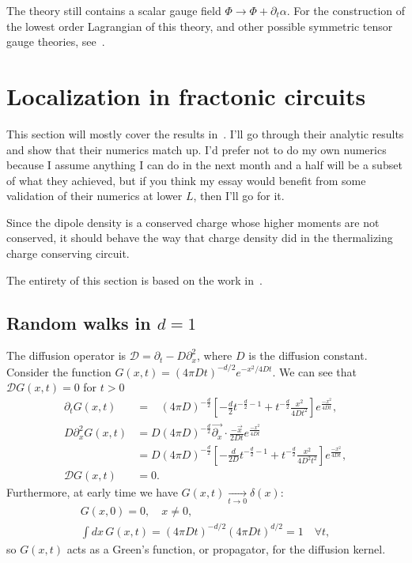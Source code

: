 \documentclass[a4paper,11pt]{article}
\newcommand{\nn}{\nonumber\\}
\begin{document}
The theory still contains a scalar gauge field $\Phi\to\Phi+\partial_t\alpha$. For the construction of the lowest order Lagrangian of this theory, and other possible symmetric tensor gauge theories, see~\cite{PretkoFractonGauge}.


\section{Localization in fractonic circuits} \label{sec:fraccirc}

This section will mostly cover the results in~\cite{PaiFracton}. I'll go through their analytic results and show that their numerics match up. I'd prefer not to do my own numerics because I assume anything I can do in the next month and a half will be a subset of what they achieved, but if you think my essay would benefit from some validation of their numerics at lower $L$, then I'll go for it. 

Since the dipole density is a conserved charge whose higher moments are not conserved, it should behave the way that charge density did in the thermalizing charge conserving circuit.

The entirety of this section is based on the work in~\cite{PaiFracton}.

\subsection{Random walks in $d=1$} \label{sub:walks}

The diffusion operator is $\mathcal{D} = \partial_t-D\partial_x^2$, where $D$ is the diffusion constant. Consider the function $G(x,t)=(4\pi Dt)^{-d/2} e^{-x^2/4Dt}$. We can see that $\mathcal{D}G(x,t)=0$ for $t>0$ 
\begin{align}
\partial_t G(x,t) &= \phantom{D}(4\pi D)^{-\frac{d}{2}} \left[-\frac{d}{2} 
	t^{-\frac{d}{2}-1} + t^{-\frac{d}{2}}\frac{x^2}{4Dt^2} \right]
	e^{\frac{-x^2}{4Dt}},\\
D\partial_x^2 G(x,t) &= D(4\pi D)^{-\frac{d}{2}} \vec{\partial_x}\cdot 
	\frac{-\vec{x}}{2Dt}e^{\frac{-x^2}{4Dt}} \nn
&= D(4\pi D)^{-\frac{d}{2}} \left[-\frac{d}{2D} 
	t^{-\frac{d}{2}
	-1} + t^{-\frac{d}{2}}\frac{x^2}{4D^2t^2} \right]e^{\frac{-x^2}{4Dt}}, \\ 
\mathcal{D}G(x,t) &= 0.
\end{align}
Furthermore, at early time we have $G(x,t)\xrightarrow[t\to0]{}\delta(x)$:
\begin{align}
G(x,0) = 0, \quad x\ne 0,\\
\int dx\, G(x,t) = (4\pi Dt)^{-d/2}(4\pi Dt)^{d/2}=1\quad \forall t,
\end{align}
so $G(x,t)$ acts as a Green's function, or propagator, for the diffusion kernel.
\end{document}
